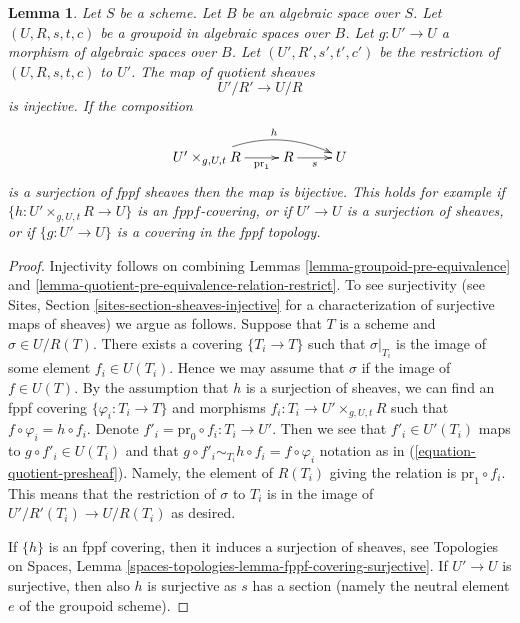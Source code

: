 \documentclass{stacks-project}
\theoremstyle{plain}
\newtheorem{lemma}[subsection]{Lemma}
\theoremstyle{definition}
\theoremstyle{remark}
\numberwithin{equation}{subsection}
\begin{document}
\begin{lemma}
\label{lemma-quotient-groupoid-restrict}
Let $S$ be a scheme. Let $B$ be an algebraic space over $S$.
Let $(U, R, s, t, c)$ be a groupoid in algebraic spaces over $B$.
Let $g : U' \to U$ a morphism of algebraic spaces over $B$.
Let $(U', R', s', t', c')$ be the restriction of $(U, R, s, t, c)$ to $U'$.
The map of quotient sheaves
$$
U'/R' \longrightarrow U/R
$$
is injective. If the composition
$$
\xymatrix{
U' \times_{g, U, t} R \ar[r]_-{\text{pr}_1} \ar@/^3ex/[rr]^h
& R \ar[r]_s & U
}
$$
is a surjection of fppf sheaves then the map is bijective.
This holds for example if $\{h : U' \times_{g, U, t} R \to U\}$ is an
$fppf$-covering, or if $U' \to U$ is a surjection of sheaves, or if
$\{g : U' \to U\}$ is a covering in the fppf topology.
\end{lemma}

\begin{proof}
Injectivity follows on combining
Lemmas \ref{lemma-groupoid-pre-equivalence} and
\ref{lemma-quotient-pre-equivalence-relation-restrict}.
To see surjectivity (see
Sites, Section \ref{sites-section-sheaves-injective}
for a characterization of surjective maps of sheaves) we argue as follows.
Suppose that $T$ is a scheme and $\sigma \in U/R(T)$.
There exists a covering $\{T_i \to T\}$ such that $\sigma|_{T_i}$
is the image of some element $f_i \in U(T_i)$. Hence we
may assume that $\sigma$ if the image of $f \in U(T)$.
By the assumption that $h$ is a surjection of sheaves, we
can find an fppf covering $\{\varphi_i : T_i \to T\}$ and morphisms
$f_i : T_i \to U' \times_{g, U, t} R$ such that
$f \circ \varphi_i = h \circ f_i$. Denote
$f'_i = \text{pr}_0 \circ f_i : T_i \to U'$. Then we see that
$f'_i \in U'(T_i)$ maps to $g \circ f'_i \in U(T_i)$ and
that $g \circ f'_i \sim_{T_i} h \circ f_i = f \circ \varphi_i$
notation as in (\ref{equation-quotient-presheaf}). Namely, the
element of $R(T_i)$ giving the relation is $\text{pr}_1 \circ f_i$.
This means that the restriction
of $\sigma$ to $T_i$ is in the image of $U'/R'(T_i) \to U/R(T_i)$
as desired.

\medskip\noindent
If $\{h\}$ is an fppf covering, then it induces a surjection of sheaves, see
Topologies on Spaces,
Lemma \ref{spaces-topologies-lemma-fppf-covering-surjective}.
If $U' \to U$ is surjective, then also $h$ is surjective as $s$ has a section
(namely the neutral element $e$ of the groupoid scheme).
\end{proof}
\end{document}
